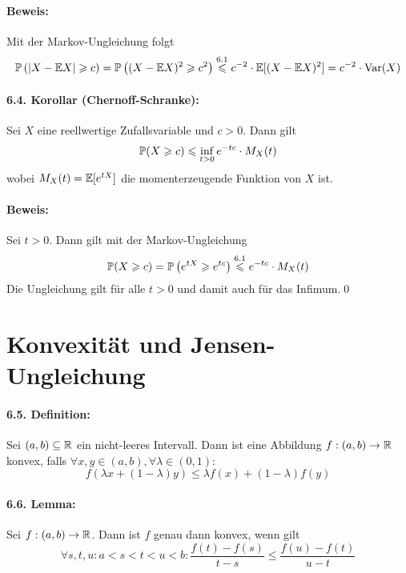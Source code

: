  \paragraph{Beweis:} Mit der Markov-Ungleichung folgt
 $$\mathbb{P}\left(|X-\mathbb{E} X|\geqslant c\right)=\mathbb{P}\left((X-\mathbb{E} X)^2\geqslant c^2\right)\overset{6.1}{\leqslant}c^{-2}\cdot\mathbb{E}[(X-\mathbb{E} X)^2]=c^{-2}\cdot\operatorname{Var}(X)$$
 
 \paragraph{6.4. Korollar (Chernoff-Schranke):}Sei $X$ eine reellwertige Zufallsvariable und $c>0$. Dann gilt
 $$\mathbb{P}(X\geqslant c)\leqslant\inf_{t>0}e^{-tc}\cdot M_X(t)$$
 wobei $M_X(t)=\mathbb{E}[e^{tX}]$ die momenterzeugende Funktion von $X$ ist.
 
 \paragraph{Beweis:} Sei $t>0$. Dann gilt mit der Markov-Ungleichung
 $$\mathbb{P}(X\geqslant c)=\mathbb{P}\left(e^{tX}\geqslant e^{tc}\right)\overset{6.1}{\leqslant}e^{-tc}\cdot M_X(t)$$
 Die Ungleichung gilt f\"ur alle $t>0$ und damit auch f\"ur das Infimum.\qed
 
 \section*{Konvexit\"at und Jensen-Ungleichung}
 
 \paragraph{6.5. Definition:}Sei $(a,b)\subseteq\mathbb{R}$ ein nicht-leeres Intervall. Dann ist eine Abbildung $f:(a,b)\to\mathbb{R}$ konvex, falls $\forall x,y\in(a,b),\forall\lambda\in(0,1):$ 
 $$f(\lambda x+(1-\lambda)y)\leq\lambda f(x)+(1-\lambda)f(y)$$
 
 \paragraph{6.6. Lemma:}Sei $f:(a,b)\to\mathbb{R}$. Dann ist $f$ genau dann konvex, wenn gilt
 $$\forall s,t,u:a<s<t<u<b:\dfrac{f(t)-f(s)}{t-s}\leq\dfrac{f(u)-f(t)}{u-t}$$
 
